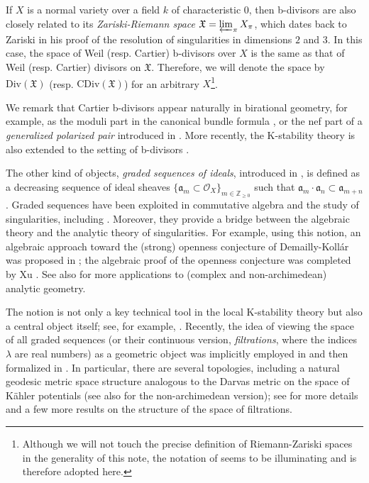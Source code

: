 \documentclass[11pt, leqno]{amsart}%
\theoremstyle{plain}
\theoremstyle{definition}
\theoremstyle{remark}
\newcommand{\cO}{\mathcal{O}}
\newcommand{\bZ}{\mathbb{Z}}
\newcommand{\fX}{\mathfrak{X}}
\newcommand{\fa}{\mathfrak{a}}
\newcommand{\Div}{\mathrm{Div}}
\newcommand{\CDiv}{\mathrm{CDiv}}
\begin{document}
If $X$ is a normal variety over a field $k$ of characteristic $0$, then b-divisors are also closely related to its \emph{Zariski-Riemann space} $\fX=\varprojlim_\pi X_\pi$, which dates back to Zariski in his proof of the resolution of singularities in dimensions $2$ and $3$. 
In this case, the space of Weil (resp. Cartier) b-divisors over $X$ is the same as that of Weil (resp. Cartier) divisors on $\fX$. Therefore, we will denote the space by $\Div(\fX)$ (resp. $\CDiv(\fX)$) for an arbitrary $X$\footnote{Although we will not touch the precise definition of Riemann-Zariski spaces in the generality of this note, the notation of \cite{BdFF-vol-iso} seems to be illuminating and is therefore adopted here.}.  

We remark that Cartier b-divisors appear naturally in birational geometry, for example, as the moduli part in the canonical bundle formula \cite{Kaw-subadj2}, or the nef part of a \emph{generalized polarized pair} introduced in \cite{BZ-gen-pair}. 
More recently, the K-stability theory is also extended to the setting of b-divisors \cite{DR-birational-K}. 

\medskip

The other kind of objects, \emph{graded sequences of ideals}, introduced in \cite{ELS-graded}, is defined as a decreasing sequence of ideal sheaves $\{\fa_m\subset \cO_X\}_{m\in\bZ_{\ge 0}}$ such that $\fa_m\cdot\fa_n\subset \fa_{m+n}$. 
Graded sequences have been exploited in commutative algebra and the study of singularities, including \cites{ELS-uniform-approx,Mus-regmult,LM-Okounkov-body,dFH-normal-sing,Cut13,Cut-adv,Dat-uniform-p}.
Moreover, they provide a bridge between the algebraic theory and the analytic theory of singularities. For example, using this notion, an algebraic approach toward the (strong) openness conjecture of Demailly-Koll\'ar \cite{DK-openness} was proposed in \cite{JM-val-ideal-seq}; the algebraic proof of the openness conjecture was completed by Xu \cite{Xu-quasi-monomial}. See also \cites{BFJ-regular-PSH,BFJ-singular-metric} for more applications to (complex and non-archimedean) analytic geometry.

The notion is not only a key technical tool in the local K-stability theory but also a central object itself; see, for example, \cites{Blu-minimizer-exist,LX-stability-kc,Liu-vol-sing-KE,XZ-sdsing}. 
Recently, the idea of viewing the space of all graded sequences (or their continuous version, \emph{filtrations}, where the indices $\lambda$ are real numbers) as a geometric object was implicitly employed in \cite{XZ-minimizer-unique} and then formalized in \cite{BLQ-convexity}. 
In particular, there are several topologies, including a natural geodesic metric space structure analogous to the Darvas metric on the space of K\"ahler potentials \cite{Dar-metric} (see also \cite{BJ-global-metric} for the non-archimedean version); see \cite{Qi-local} for more details and a few more results on the structure of the space of filtrations. 
\end{document}
